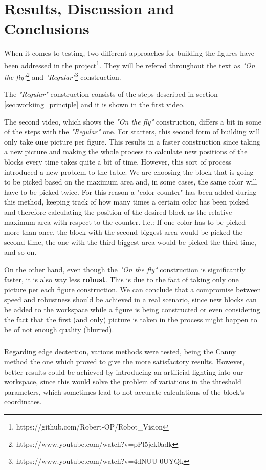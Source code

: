 \chapter{Results, Discussion and Conclusions}\label{ch:conclusion}

When it comes to testing, two different approaches for building the figures have been addressed in the project\footnote{https://github.com/Robert-OP/Robot\_Vision}. They will be refered throughout the text as \textit{"On the fly"}\footnote{https://www.youtube.com/watch?v=pPl5jek0adk} and \textit{"Regular"}\footnote{https://www.youtube.com/watch?v=4dNUU-0UYQk} construction.

The \textit{"Regular"} construction consists of the steps described in section \ref{sec:workiing_principle} and it is shown in the first video. 

The second video, which shows the \textit{"On the fly"} construction, differs a bit in some of the steps with the \textit{"Regular"} one.
For starters, this second form of building will only take \textbf{one} picture per figure. This results in a faster construction since taking a new picture and making the whole process to calculate new positions of the blocks every time takes quite a bit of time.
However, this sort of process introduced a new problem to the table. We are choosing the block that is going to be picked based on the maximum area and, in some cases, the same color will have to be picked twice.
For this reason a "color counter" has been added during this method, keeping track of how many times a certain color has been picked and therefore calculating the position of the desired block as the relative maximum area with respect to the counter. I.e.: If one color has to be picked more than once, the block with the second biggest area would be picked the second time, the one with the third biggest area would be picked the third time, and so on. 

On the other hand, even though the \textit{"On the fly"} construction is significantly faster, it is also way less \textbf{robust}. This is due to the fact of taking only one picture per each figure construction. 
We can conclude that a compromise between speed and robustness should be achieved in a real scenario, since new blocks can be added to the workspace while a figure is being constructed or even considering the fact that the first (and only) picture is taken in the process might happen to be of not enough quality (blurred).

\paragraph{} Regarding edge dectection, various methods were tested, being the Canny method the one which proved to give the more satisfactory results. 
However, better results could be achieved by introducing an artificial lighting into our workspace, since this would solve the problem of variations in the threshold parameters, which sometimes lead to not accurate calculations of the block's coordinates.


